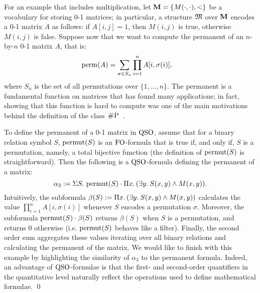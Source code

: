 \begin{exa}\label{exa-perm}
For an example that includes multiplication, let $\mathbf{M} = \{M(\cdot,\cdot),<\}$ be a vocabulary for storing 0-1 matrices; in particular, a structure $\mathfrak{M}$ over $\mathbf{M}$ encodes a 0-1 matrix $A$ as follows: if $A[i,j] = 1$, then $M(i,j)$ is true, otherwise $M(i,j)$ is false.
Suppose now that we want to compute the permanent of an $n$-by-$n$ 0-1 matrix $A$, that is:
\begin{align*}
\operatorname{perm}(A) &= \sum_{\sigma \in S_n} \prod_{i=1}^n A[i, \sigma(i)],  
\end{align*}
where $S_n$ is the set of all permutations over $\{1, \ldots, n\}$.
The permanent is a fundamental function on matrices that has found many applications;
in fact, showing that this function is hard to compute was one of the main motivations behind the definition of the class $\text{\sc \#P}$~\cite{Valiant79}.

To define the permanent of a 0-1 matrix in ${\rm QSO}$, assume that for a binary relation symbol $S$, $\operatorname{permut}(S)$ is an ${\rm FO}$-formula that is true if, and only if, $S$ is a permutation, namely, a total bijective function (the definition of $\operatorname{permut}(S)$ is straightforward).
Then the following is a ${\rm QSO}$-formula defining the permanent of a matrix:
\[
\alpha_3 := \Sigma{S}.\, \operatorname{permut}(S) \cdot \Pi{x}.\, (\exists{y}.\: S(x,y) \wedge M(x,y)).
\]
Intuitively, the subformula $\beta(S) := \Pi{x}.\, (\exists{y}.\: S(x,y) \wedge M(x,y))$ calculates the value \linebreak $\prod_{i=1}^n A[i, \sigma(i)]$ whenever $S$ encodes a permutation $\sigma$.
Moreover, the subformula $\operatorname{permut}(S) \cdot \beta(S)$ returns $\beta(S)$ when $S$ is a permutation, and returns $0$ otherwise (i.e. $\operatorname{permut}(S)$ behaves like a filter). 
Finally, the second order sum aggregates these values iterating over all binary relations and calculating the permanent of the matrix.
We would like to finish with this example by highlighting the similarity of $\alpha_3$ to the permanent formula. 
Indeed, an advantage of ${\rm QSO}$-formulae is that the first- and second-order quantifiers in the quantitative level naturally reflect the operations used to define mathematical formulae. \qed
\end{exa}

